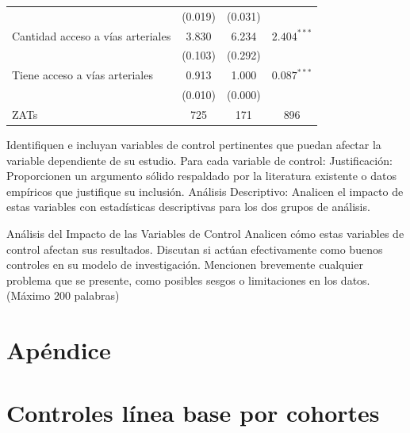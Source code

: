 \documentclass{article}
\begin{document}
\begin{table} [H]
\begin{adjustbox}{width=\textwidth,center}
\begin{tabular}{l c c c}
      & (0.019) & (0.031) & \\
      Cantidad acceso a vías arteriales & 3.830 & 6.234 & $2.404^{***}$ \\
      & (0.103) & (0.292) & \\
      Tiene acceso a vías arteriales & 0.913 & 1.000 & $0.087^{***}$ \\
      & (0.010) & (0.000) & \\
      \midrule
      \midrule
      ZATs & 725 & 171 & 896 \\
      \bottomrule
    \end{tabular}
  \end{adjustbox}
\end{table}

Identifiquen e incluyan variables de control pertinentes que puedan afectar la variable dependiente de su estudio. Para cada variable de control:
Justificación: Proporcionen un argumento sólido respaldado por la literatura existente o datos empíricos que justifique su inclusión.
Análisis Descriptivo: Analicen el impacto de estas variables con estadísticas descriptivas para los dos grupos de análisis.

Análisis del Impacto de las Variables de Control
Analicen cómo estas variables de control afectan sus resultados. Discutan si actúan
efectivamente como buenos controles en su modelo de investigación. Mencionen
brevemente cualquier problema que se presente, como posibles sesgos o limitaciones en los
datos. (Máximo 200 palabras)


\printbibliography

\section{Apéndice}

\appendix
{}

\section{Controles línea base por cohortes}
\end{document}

